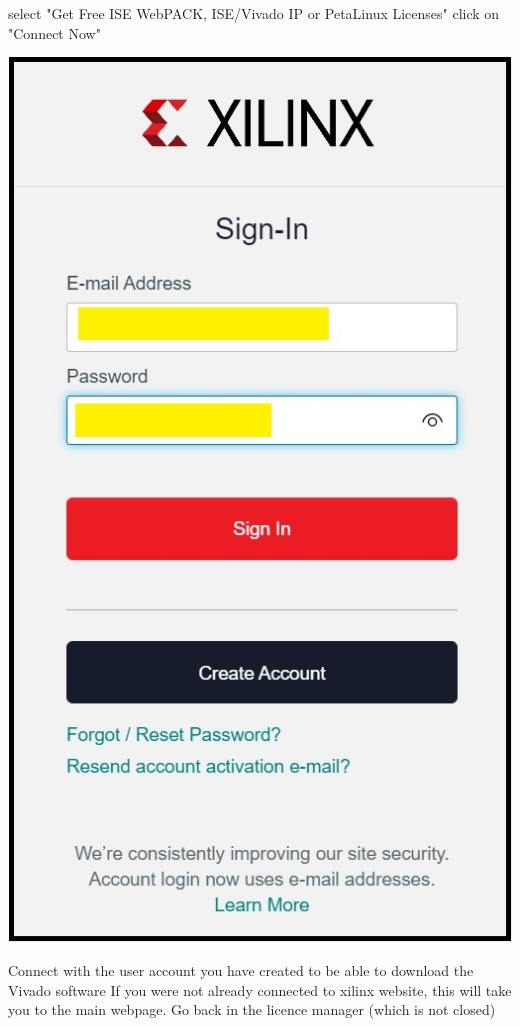 select "Get Free ISE WebPACK, ISE/Vivado IP or PetaLinux Licenses"
click on "Connect Now"

\includegraphics[width=\linewidth]{images/VivadoInstimg024.jpg}

Connect with the user account you have created to be able to download the Vivado software
If you were not already connected to xilinx website, this will take you to the main webpage.
Go back in the licence manager (which is not closed)

